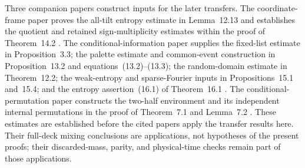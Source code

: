 Three companion papers construct inputs for the later transfers.
The coordinate-frame paper proves the all-tilt entropy estimate in
Lemma~12.13 and establishes the quotient and retained sign-multiplicity
estimates within the proof of Theorem~14.2 \cite{companion-frames}.
The conditional-information paper supplies the fixed-list estimate in
Proposition~3.3; the palette estimate and common-event construction in
Proposition~13.2 and equations~(13.2)--(13.3); the random-domain
estimate in Theorem~12.2; the weak-entropy and sparse-Fourier inputs in
Propositions~15.1 and~15.4; and the entropy assertion~(16.1) of
Theorem~16.1 \cite{companion-information}.
The conditional-permutation paper constructs the two-half environment
and its independent internal permutations in the proof of Theorem~7.1
and Lemma~7.2 \cite{companion-kernels}.
These estimates are established before the cited papers apply the
transfer results here. Their full-deck mixing conclusions are
applications, not hypotheses of the present proofs; their discarded-mass,
parity, and physical-time checks remain part of those applications.
